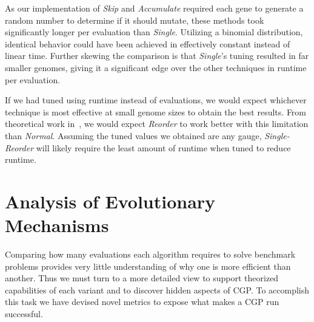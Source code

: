\documentclass[journal]{IEEEtran}
\begin{document}
As our implementation of \emph{Skip} and \emph{Accumulate} required each gene
to generate a random number to determine if it should mutate, these methods took
significantly longer per evaluation than \emph{Single}.  Utilizing a binomial
distribution, identical behavior could have been achieved in effectively constant
instead of linear time.  Further skewing the comparison is that \emph{Single}'s
tuning resulted in far smaller genomes, giving it a significant edge over the other
techniques in runtime per evaluation.

If we had tuned using runtime instead of evaluations, we would expect whichever
technique is most effective at small genome sizes to obtain the best results.
From theoretical work in~\cite{goldman:2013:ordering}, we would expect \emph{Reorder}
to work better with this limitation than \emph{Normal}.  Assuming the tuned values
we obtained are any gauge, \emph{Single-Reorder} will likely require the least
amount of runtime when tuned to reduce runtime.

\section{Analysis of Evolutionary Mechanisms}
\label{sec:analysis}
Comparing how many evaluations each algorithm requires to solve benchmark
problems provides very little understanding of why one is more efficient than another.
Thus we must turn to a more detailed view
to support theorized capabilities of each variant and
to discover hidden aspects of CGP.
To accomplish this task we have devised novel metrics to expose what makes a
CGP run successful.
\end{document}
